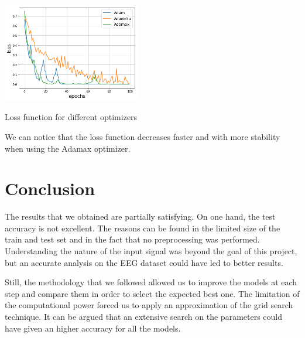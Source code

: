 \documentclass[10pt,conference,compsocconf]{IEEEtran}
\begin{document}
\begin{center}
	\captionsetup{type=figure}
	\includegraphics[width=0.45\textwidth]{img/optimizationAdam.png}
	\caption {Loss function for different optimizers}
	\label{fig:CrossVal}
\end{center}
We can notice that the loss function decreases faster and with more stability when using the Adamax optimizer.

\section{Conclusion}
\label{sec:conclusion}
The results that we obtained are partially satisfying. On one hand, the test accuracy is not excellent. The reasons can be found in the limited size of the train and test set and in the fact that no preprocessing was performed. Understanding the nature of the input signal was beyond the goal of this project, but an accurate analysis on the EEG dataset could have led to better results.

Still, the methodology that we followed allowed us to improve the models at each step and compare them in order to select the expected best one. The limitation of the computational power forced us to apply an approximation of the grid search technique. It can be argued that an extensive search on the parameters could have given an higher accuracy for all the models.
\end{document}
